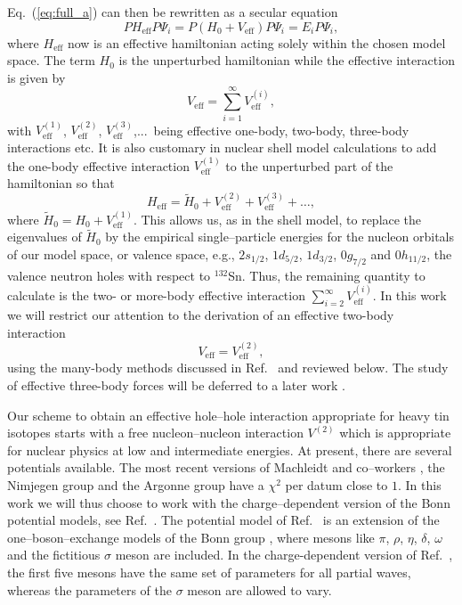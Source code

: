 Eq.\ (\ref{eq:full_a})  can then be rewritten as a secular equation
\begin{equation}
    PH_{\mathrm{eff}}P\Psi_i=P(H_{0}+V_{\mathrm{eff}})
    P\Psi_i=E_iP\Psi_i,
\end{equation}
where $H_{\mathrm{eff}}$  now is an effective hamiltonian acting solely
within the chosen model space. The term $H_0$
is the unperturbed hamiltonian while the effective interaction is
given by
\begin{equation}
  V_{\mathrm{eff}}=\sum_{i=1}^{\infty} V_{\mathrm{eff}}^{(i)},
\end{equation}
with $ V_{\mathrm{eff}}^{(1)}$,  $ V_{\mathrm{eff}}^{(2)}$,
 $ V_{\mathrm{eff}}^{(3)}$,...\ being effective one-body, two-body,
three-body interactions etc. 
It is also customary in nuclear shell model calculations to add
the one-body effective interaction  $ V_{\mathrm{eff}}^{(1)}$
to the unperturbed part of the hamiltonian so that
\begin{equation}
    H_{\mathrm{eff}}=\tilde{H}_{0}+  V_{\mathrm{eff}}^{(2)}+
    V_{\mathrm{eff}}^{(3)}+\dots,
\end{equation}     
where $\tilde{H}_{0}=H_{0}+V_{\mathrm{eff}}^{(1)}$. This allows us,
as in the shell model, to replace the eigenvalues of 
$\tilde{H}_{0}$ by the empirical single--particle energies 
for the nucleon orbitals of our model space, or valence space, e.g.,
$2s_{1/2}$, $1d_{5/2}$, $1d_{3/2}$, $0g_{7/2}$ and $0h_{11/2}$, the
valence neutron holes with respect to $^{132}$Sn. 
Thus, the remaining quantity to calculate is the two- or more-body
effective interaction 
$\sum_{i=2}^{\infty} V_{\mathrm{eff}}^{(i)}$.
In this work we will restrict our attention to the derivation of
an effective two-body interaction 
\begin{equation}
      V_{\mathrm{eff}}=V_{\mathrm{eff}}^{(2)},
\end{equation}
using the many-body methods discussed in Ref.\ \cite{hko95}
and reviewed below.
The study of effective three-body forces will be deferred to a later
work \cite{eh97}. 

Our scheme to obtain an effective hole--hole interaction appropriate for 
heavy tin isotopes
starts with a free nucleon--nucleon  interaction $V^{(2)}$ which is
appropriate for nuclear physics at low and intermediate energies. 
At present, there are several potentials available. The most recent 
versions of Machleidt and co--workers
\cite{cdbonn}, the Nimjegen group \cite{nim} and the Argonne
group \cite{v18} have a $\chi^2$ per datum close to $1$.
In this work we will thus choose to work with the charge--dependent
version of the Bonn potential models, see Ref.\ \cite{cdbonn}.
The potential model of Ref.\ \cite{cdbonn} is an extension of the 
one--boson--exchange models of the Bonn group \cite{mac89}, where mesons 
like $\pi$, $\rho$, $\eta$, $\delta$, $\omega$ and the fictitious
$\sigma$ meson are included. In the charge-dependent version
of Ref.\ \cite{cdbonn}, the first five mesons have the same set
of parameters for all partial waves, whereas the parameters of
the $\sigma$ meson are allowed to vary. 

